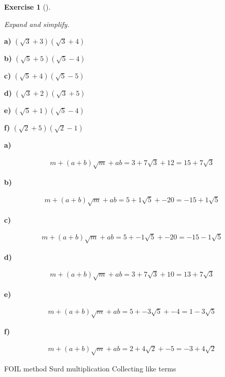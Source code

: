 \documentclass[
  letterpaper,
  DIV=11,
  numbers=noendperiod]{scrreprt}
\theoremstyle{definition}
\newtheorem{exercise}{Exercise}[chapter]
\theoremstyle{remark}
\begin{document}
\begin{exercise}[]\protect\hypertarget{exr-u2-47}{}\label{exr-u2-47}

\emph{Expand and simplify.}

\textbf{a)} \(\displaystyle (\sqrt{3} + 3)(\sqrt{3} + 4)\)

\textbf{b)} \(\displaystyle (\sqrt{5} + 5)(\sqrt{5} - 4)\)

\textbf{c)} \(\displaystyle (\sqrt{5} + 4)(\sqrt{5} - 5)\)

\textbf{d)} \(\displaystyle (\sqrt{3} + 2)(\sqrt{3} + 5)\)

\textbf{e)} \(\displaystyle (\sqrt{5} + 1)(\sqrt{5} - 4)\)

\textbf{f)} \(\displaystyle (\sqrt{2} + 5)(\sqrt{2} - 1)\)

\begin{tcolorbox}[enhanced jigsaw, opacitybacktitle=0.6, coltitle=black, arc=.35mm, colframe=quarto-callout-tip-color-frame, colback=white, bottomrule=.15mm, left=2mm, colbacktitle=quarto-callout-tip-color!10!white, titlerule=0mm, opacityback=0, title=\textcolor{quarto-callout-tip-color}{\faLightbulb}\hspace{0.5em}{🔍 View Solutions}, leftrule=.75mm, breakable, rightrule=.15mm, bottomtitle=1mm, toptitle=1mm, toprule=.15mm]

\textbf{a)}

\[
\begin{aligned}
m + (a+b)\sqrt{m} + ab = 3 + 7\sqrt{3} + 12 = 15 + 7\sqrt{3}
\end{aligned}
\]

\textbf{b)}

\[
\begin{aligned}
m + (a+b)\sqrt{m} + ab = 5 + 1\sqrt{5} + -20 = -15 + 1\sqrt{5}
\end{aligned}
\]

\textbf{c)}

\[
\begin{aligned}
m + (a+b)\sqrt{m} + ab = 5 + -1\sqrt{5} + -20 = -15 - 1\sqrt{5}
\end{aligned}
\]

\textbf{d)}

\[
\begin{aligned}
m + (a+b)\sqrt{m} + ab = 3 + 7\sqrt{3} + 10 = 13 + 7\sqrt{3}
\end{aligned}
\]

\textbf{e)}

\[
\begin{aligned}
m + (a+b)\sqrt{m} + ab = 5 + -3\sqrt{5} + -4 = 1 - 3\sqrt{5}
\end{aligned}
\]

\textbf{f)}

\[
\begin{aligned}
m + (a+b)\sqrt{m} + ab = 2 + 4\sqrt{2} + -5 = -3 + 4\sqrt{2}
\end{aligned}
\]

\end{tcolorbox}

{FOIL method} {Surd multiplication} {Collecting like terms}

\end{exercise}
\end{document}
